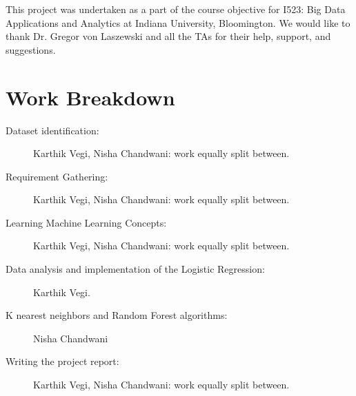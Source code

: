 \documentclass[sigconf]{acmart}
\begin{document}
\begin{acks}
This project was undertaken as a part of the course objective for I523: Big Data Applications and Analytics at Indiana
University, Bloomington. We would like to thank Dr. Gregor
von Laszewski and all the TAs for their help, support, and suggestions. 

\end{acks}

\newpage
\appendix 
\section{Work Breakdown} 
\begin{description} 
\item[Dataset identification:] Karthik Vegi, Nisha Chandwani: work equally split between.
\item[Requirement Gathering:] Karthik Vegi, Nisha Chandwani: work equally split between.
\item[Learning Machine Learning Concepts:] Karthik Vegi,  Nisha Chandwani: work equally split between.
\item[Data analysis and implementation of the Logistic Regression:] Karthik Vegi.
\item[K nearest neighbors and Random Forest algorithms:] Nisha Chandwani
\item[Writing the project report:] Karthik Vegi, Nisha Chandwani: work equally split between.
\end{description} 


 
\end{document}
